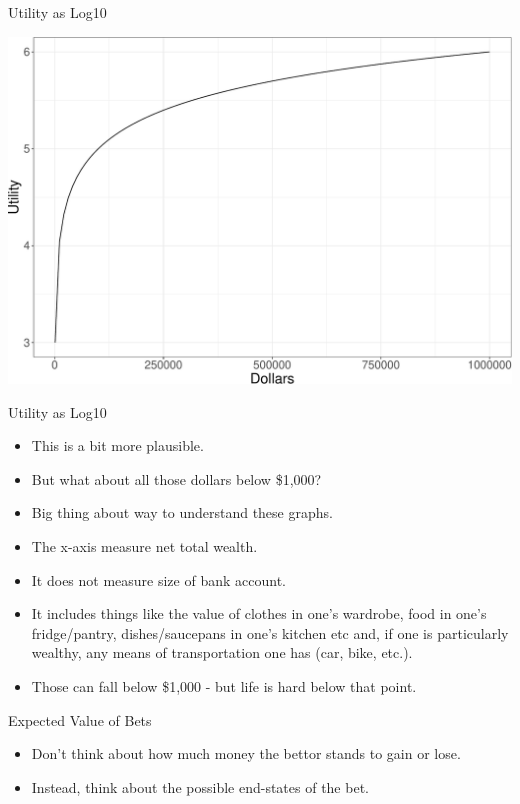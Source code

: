 \documentclass[
  ignorenonframetext,
]{beamer}
\providecommand{\tightlist}{%
  \setlength{\itemsep}{0pt}\setlength{\parskip}{0pt}}
\renewcommand{\,}{\text{, }}
\begin{document}
\begin{frame}{Utility as Log10}
\protect\hypertarget{utility-as-log10}{}
\begin{center}


\includegraphics[width=0.9\linewidth]{09_5_files/figure-beamer/unnamed-chunk-2-1} 

\end{center}
\end{frame}

\begin{frame}{Utility as Log10}
\protect\hypertarget{utility-as-log10-1}{}
\begin{itemize}
\tightlist
\item
  This is a bit more plausible.
\item
  But what about all those dollars below \$1,000?
\item
  Big thing about way to understand these graphs.
\item
  The x-axis measure net total wealth.
\item
  It does not measure size of bank account.
\item
  It includes things like the value of clothes in one's wardrobe, food
  in one's fridge/pantry, dishes/saucepans in one's kitchen etc and, if
  one is particularly wealthy, any means of transportation one has (car,
  bike, etc.).
\item
  Those can fall below \$1,000 - but life is hard below that point.
\end{itemize}
\end{frame}

\begin{frame}{Expected Value of Bets}
\protect\hypertarget{expected-value-of-bets}{}
\begin{itemize}
\tightlist
\item
  Don't think about how much money the bettor stands to gain or lose.
\item
  Instead, think about the possible end-states of the bet.
\end{itemize}
\end{frame}
\end{document}
